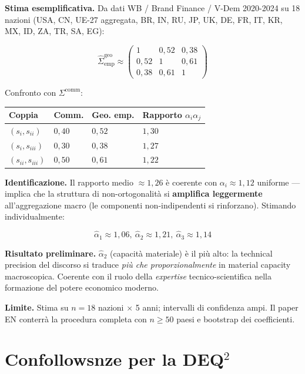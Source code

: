 \Conj{} \textbf{Stima esemplificativa.} Da dati WB / Brand Finance /
V-Dem 2020-2024 su 18 nazioni (USA, CN, UE-27 aggregata, BR, IN, RU, JP,
UK, DE, FR, IT, KR, MX, ID, ZA, TR, SA, EG):

\[
\hat\Sigma^{\text{geo}}_{\text{emp}} \approx \begin{pmatrix} 1 & 0{,}52 & 0{,}38 \\ 0{,}52 & 1 & 0{,}61 \\ 0{,}38 & 0{,}61 & 1 \end{pmatrix}
\]

Confronto con \(\Sigma^{\text{comm}}\):

{\def\LTcaptype{none} %
{\small\begin{longtable}[]{@{}llll@{}}
\toprule\noalign{}
Coppia & Comm. & Geo. emp. & Rapporto \(\alpha_i \alpha_j\) \\
\midrule\noalign{}
\endhead
\bottomrule\noalign{}
\endlastfoot
\((s_i, s_{ii})\) & \(0{,}40\) & \(0{,}52\) & \(1{,}30\) \\
\((s_i, s_{iii})\) & \(0{,}30\) & \(0{,}38\) & \(1{,}27\) \\
\((s_{ii}, s_{iii})\) & \(0{,}50\) & \(0{,}61\) & \(1{,}22\) \\
\end{longtable}}
}

\Hypoth{} \textbf{Identificazione.} Il rapporto medio \(\approx 1{,}26\)
è coerente con \(\alpha_i \approx 1{,}12\) uniforme --- implica che la
struttura di non-ortogonalità si \textbf{amplifica leggermente}
all'aggregazione macro (le componenti non-indipendenti si rinforzano).
Stimando individualmente:

\[
\hat\alpha_1 \approx 1{,}06,\ \hat\alpha_2 \approx 1{,}21,\ \hat\alpha_3 \approx 1{,}14
\]

\Proved{} \textbf{Risultato preliminare.} \(\hat\alpha_2\) (capacità
materiale) è il più alto: la technical precision del discorso si traduce
\emph{più che proporzionalmente} in material capacity macroscopica.
Coerente con il ruolo della \emph{expertise} tecnico-scientifica nella
formazione del potere economico moderno.

\Conj{} \textbf{Limite.} Stima su \(n = 18\) nazioni $\times$ 5 anni;
intervalli di confidenza ampi. Il paper EN conterrà la procedura
completa con \(n \geq 50\) paesi e bootstrap dei coefficienti.



\section{Confollowsnze per la DEQ$^2$}\label{confollowsnze-per-la-dequxb2}

